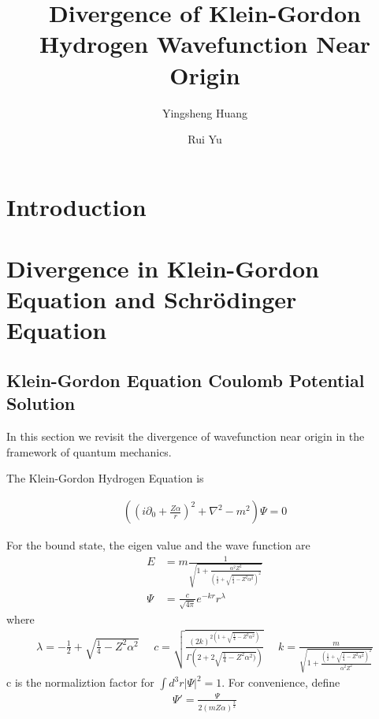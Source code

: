 \documentclass[aps,prd,preprint,showkeys,10pt]{revtex4-1}
\begin{document}
\title{Divergence of Klein-Gordon Hydrogen Wavefunction Near Origin}
\author{Yingsheng Huang}
\author{Rui Yu}




\begin{abstract}

\end{abstract}
\keywords{}

\maketitle


\section*{Introduction}



\section{Divergence in Klein-Gordon Equation and Schr\"odinger Equation}
\subsection{Klein-Gordon Equation Coulomb Potential Solution}
In this section we revisit the divergence of wavefunction near origin in the framework of quantum mechanics. 

The Klein-Gordon Hydrogen Equation is

\begin{align}
	((i\partial_0+\frac{Z\alpha}{r})^2+\nabla^2-m^2)\Psi=0
\end{align}

For the bound state, the eigen value and the wave function are\cite{Greiner2000}
\begin{align}
	E    & =m\frac{1}{\sqrt{1+\frac{\alpha^2 Z^2}{(\frac{1}{2}+\sqrt{\frac{1}{4}-Z^2\alpha^2})^2}}} \\
	\Psi & =\frac{c}{\sqrt{4\pi}}e^{-kr}r^\lambda
\end{align}
where
\begin{align}
	\lambda=-\frac{1}{2}+\sqrt{\frac{1}{4}-Z^2\alpha^2}\ \ \ \ \ \
	c=\sqrt{\frac{(2k)^{2(1+\sqrt{\frac{1}{4}-Z^2\alpha^2})}}{\Gamma(2+2\sqrt{\frac{1}{4}-Z^2\alpha^2)})}}\ \ \ \ \ \
	k=\frac{m}{\sqrt{1+\frac{(\frac{1}{2}+\sqrt{\frac{1}{4}-Z^2\alpha^2})^2}{\alpha^2Z^2}}}
\end{align}
c is the normaliztion factor for $\int d^3r|\Psi|^2=1$. For convenience, define
\begin{align}
	\Psi '=\frac{\Psi}{2(mZ\alpha)^\frac{3}{2}}
\end{align}
\end{document}
